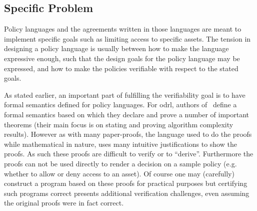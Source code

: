 \documentclass[runningheads,a4paper]{llncs}
\begin{document}
%
%
%
%


\subsection{Specific Problem}

Policy languages and the agreements written in those languages are meant to implement specific goals such as limiting access to specific assets. The tension in designing a policy language is usually between how to make the language expressive enough, such that the design goals for the policy language may be expressed, and how to make the policies verifiable with respect to the stated goals.

As stated earlier, an important part of fulfilling the verifiability goal is to have formal semantics defined for policy languages. For \ac{odrl}, authors of~\cite{pucella2006} define a formal semantics based on which they declare and prove a number of important theorems (their main focus is on stating and proving algorithm complexity results). However as with many paper-proofs, the language used to do the proofs while mathematical in nature, uses many intuitive justifications to show the proofs. As such these proofs are difficult to verify or to ``derive''. Furthermore the proofs can not be used directly to render a decision on a sample policy (e.g. whether to allow or deny access to an asset). Of course one may (carefully) construct a program based on these proofs for practical purposes but certifying such programs correct presents additional verification challenges, even assuming the original proofs were in fact correct.
\end{document}
